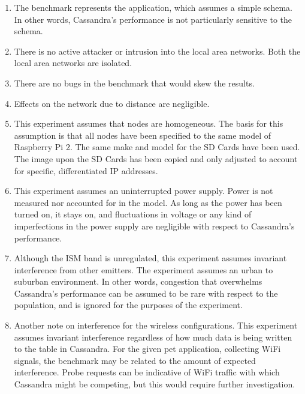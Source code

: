 \begin{enumerate}

\item The benchmark represents the application, which assumes a simple schema.  In other words, Cassandra's performance is not particularly sensitive to the schema.

\item There is no active attacker or intrusion into the local area networks.  Both the local area networks are isolated.


\item There are no bugs in the benchmark that would skew the results.

\item Effects on the network due to distance are negligible.



\item This experiment assumes that nodes are homogeneous.  The basis for this assumption is that all nodes have been specified to the same model of Raspberry Pi 2.  The same make and model for the SD Cards have been used.  The image upon the SD Cards has been copied and only adjusted to account for specific, differentiated IP addresses.


\item This experiment assumes an uninterrupted power supply.  Power is not measured nor accounted for in the model.  As long as the power has been turned on, it stays on, and fluctuations in voltage or any kind of imperfections in the power supply are negligible with respect to Cassandra's performance.

\item Although the ISM band is unregulated, this experiment assumes invariant interference from other emitters.  The experiment assumes an urban to suburban environment.  In other words, congestion that overwhelms Cassandra's performance can be assumed to be rare with respect to the population, and is ignored for the purposes of the experiment.

\item Another note on interference for the wireless configurations.  This experiment assumes invariant interference regardless of how much data is being written to the table in Cassandra. For the given pet application, collecting WiFi signals, the benchmark may be related to the amount of expected interference.  Probe requests can be indicative of WiFi traffic with which Cassandra might be competing, but this would require further investigation.  

\end{enumerate}

